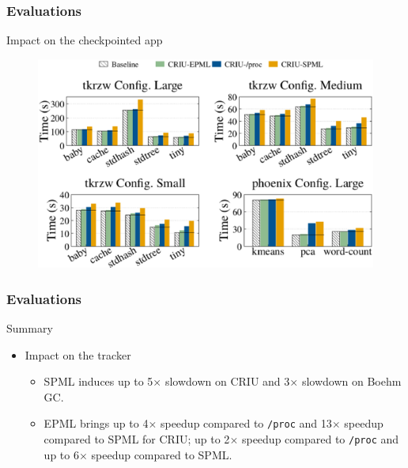 \documentclass[xcolor=table,bigger,unknownkeysallowed]{beamer}
\begin{document}
        \begin{frame}
                \frametitle{Evaluations}
				\begin{block}{Impact on the checkpointed app}
\begin{figure}[!h]
	\centering 
	\includegraphics[width=.6\linewidth]{fig/criu-results-tracked}
\end{figure}										
			\end{block}
        \end{frame}         
        \begin{frame}
                \frametitle{Evaluations}
				\begin{block}{Summary}
					\begin{itemize}
						\item Impact on the tracker
						\begin{itemize}
							\item SPML induces up to 5$\times$ slowdown on CRIU and 3$\times$ slowdown on Boehm GC.
							\item EPML brings up to 4$\times$ speedup compared to \texttt{/proc} and 13$\times$ speedup compared to SPML for CRIU; up to 2$\times$ speedup compared to \texttt{/proc} and up to 6$\times$ speedup compared to SPML.
						\end{itemize}																							
					\end{itemize}
			\end{block}
        \end{frame}  
\end{document}
